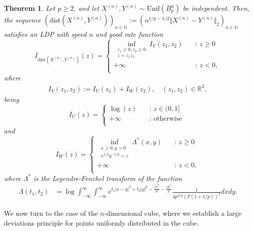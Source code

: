 \documentclass[10pt]{amsart}
\newtheorem{theorem}{Theorem}[section]
\newcounter{theor}
\def\R{\mathbb{R}}
\def\N{\mathbb{N}}
\def\dist{\text{dist}}
\numberwithin{equation}{section}
\begin{document}
\begin{theorem}
\label{ThmLDPpgeq2}
Let $p\geq 2$, and let $X^{(n)} , Y^{(n)} \sim \text{Unif} ( B_p^n)$ be independent. Then, the sequence $\left( \text{dist}(X^{(n)} , Y^{(n)}) \right)_{n \in \N} := \left( n^{1/p - 1/2} \Vert X^{(n)} - Y^{(n)} \Vert _2 \right)_{n \in \N}$ satisfies an LDP with speed $n$ and good rate function
\[   
I_{\dist(X^{(n)} , Y^{(n)})}(z) = 
     \begin{cases}
       \displaystyle{\inf_{ \substack{z_1 \geq 0, z_2 \geq 0 \\ z=z_1z_2}} I_V (z_1,z_2)}  &\quad\text{: }z \geq 0\\
       + \infty &\quad\text{: } z<0, \\ 
     \end{cases}
\]
where
\begin{align*}
I_V(z_1,z_2) := I_U(z_1) + I_W(z_2), \quad (z_1,z_2)\in \R^2,
\end{align*}
being
\[   
I_U(z) = 
     \begin{cases}
       \log (z) &\quad\text{: }z \in (0, 1]\\
       + \infty &\quad\text{: otherwise } \\ 
     \end{cases}
\]
and
\[   
I_W(z) = 
     \begin{cases}
       \displaystyle{\inf_{ \substack{x \geq 0, y > 0 \\ x^{1/2}y^{-1/p} = z}} \Lambda ^* (x,y)}  &\quad\text{: }z \geq 0\\
       + \infty &\quad\text{: }z < 0, \\ 
     \end{cases}
\]
where $ \Lambda^* $ is the Legendre-Fenchel transform of the function
\begin{align*}
\Lambda (t_1,t_2) & = \log \int _{-\infty} ^{\infty} \int _{-\infty} ^{\infty} e^{t_1 |x-y|^2 + t_2|y|^p    
  - \frac{|x|^p}{p} - \frac{|y|^p}{p} } \frac{1}{4p^{2/p} \left( \Gamma(1 + 1/p) \right)^2} dx dy .
\end{align*}
\end{theorem}


We now turn to the case of the $n$-dimensional cube, where we establish a large deviations principle for points uniformly distributed in the cube.
\end{document}
